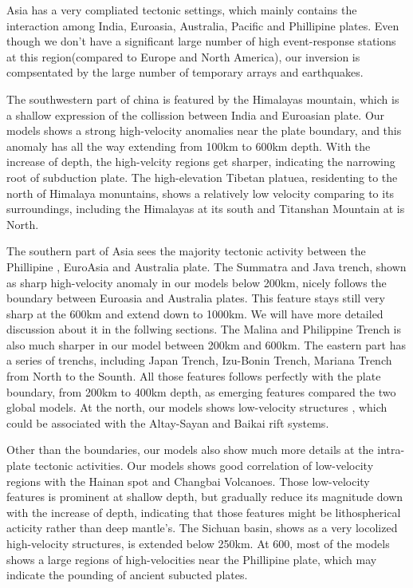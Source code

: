 \documentclass[extra,mreferee]{gji}
\begin{document}
Asia has a very compliated tectonic settings, which mainly contains the interaction
among India, Euroasia, Australia, Pacific and Phillipine plates. Even though we don't
have a significant large number of high event-response stations at this region(compared
to Europe and North America), our inversion is compsentated by the large number of
temporary arrays and earthquakes.

The southwestern part of china is featured by the Himalayas mountain, which is 
a shallow expression of the collission between India and Euroasian plate. Our
models shows a strong high-velocity anomalies near the plate boundary, and this
anomaly has all the way extending from 100km to 600km depth. With the increase
of depth, the high-velcity regions get sharper, indicating the narrowing
root of subduction plate. The high-elevation Tibetan platuea, residenting to
the north of Himalaya monuntains, shows a relatively low velocity
comparing to its surroundings, including the Himalayas at its south and Titanshan
Mountain at is North.

The southern part of Asia sees the majority tectonic activity between the Phillipine
, EuroAsia and Australia plate. The Summatra and Java trench, shown as sharp high-velocity
anomaly in our models below 200km, nicely follows the boundary between Euroasia
and Australia plates. This feature stays still very sharp at the 600km and extend
down to 1000km. We will have more detailed discussion about it in the follwing sections.
The Malina and Philippine Trench is also much sharper in our model between 200km and
600km.
The eastern part has a series of trenchs, including Japan Trench, Izu-Bonin Trench,
Mariana Trench from North to the Sounth. All those features follows perfectly with
the plate boundary, from 200km to 400km depth, as emerging features
compared the two global models. At the north, our models shows low-velocity structures
, which could be associated with the Altay-Sayan and Baikai rift systems.

Other than the boundaries, our models also show much more details at the intra-plate
tectonic activities. Our models shows good correlation of low-velocity regions with
the Hainan spot and Changbai Volcanoes. Those low-velocity features is prominent at shallow
depth, but gradually reduce its magnitude down with the increase of depth, indicating
that those features might be lithospherical acticity rather than deep mantle's. The Sichuan
basin, shows as a very locolized high-velocity structures, is extended below 250km.
At 600, most of the models shows a large regions of high-velocities near the Phillipine
plate, which may indicate the pounding of ancient subucted plates.
\end{document}
